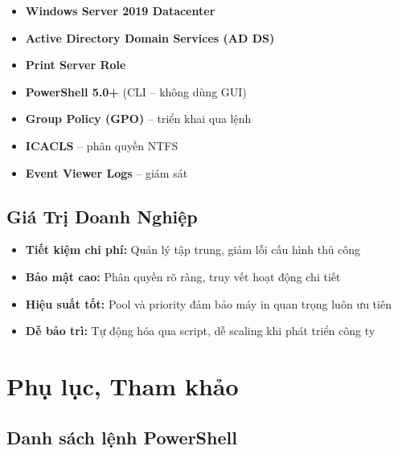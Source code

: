 \begin{itemize}
    \item \textbf{Windows Server 2019 Datacenter}
    \item \textbf{Active Directory Domain Services (AD DS)}
    \item \textbf{Print Server Role}
    \item \textbf{PowerShell 5.0+} (CLI -- không dùng GUI)
    \item \textbf{Group Policy (GPO)} -- triển khai qua lệnh
    \item \textbf{ICACLS} -- phân quyền NTFS
    \item \textbf{Event Viewer Logs} -- giám sát
\end{itemize}

\section{Giá Trị Doanh Nghiệp}

\begin{itemize}
    \item \textbf{Tiết kiệm chi phí:} Quản lý tập trung, giảm lỗi cấu hình thủ công
    \item \textbf{Bảo mật cao:} Phân quyền rõ ràng, truy vết hoạt động chi tiết
    \item \textbf{Hiệu suất tốt:} Pool và priority đảm bảo máy in quan trọng luôn ưu tiên
    \item \textbf{Dễ bảo trì:} Tự động hóa qua script, dễ scaling khi phát triển công ty
\end{itemize}

\chapter{\textbf{Phụ lục, Tham khảo}}

\section{Danh sách lệnh PowerShell}

